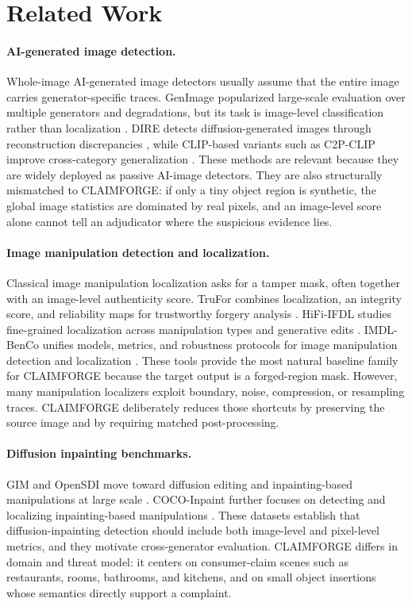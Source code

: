 \section{Related Work}

\paragraph{AI-generated image detection.}
Whole-image AI-generated image detectors usually assume that the entire image carries generator-specific traces. GenImage popularized large-scale evaluation over multiple generators and degradations, but its task is image-level classification rather than localization \citep{zhu2023genimage}. DIRE detects diffusion-generated images through reconstruction discrepancies \citep{wang2023dire}, while CLIP-based variants such as C2P-CLIP improve cross-category generalization \citep{tan2024c2pclip}. These methods are relevant because they are widely deployed as passive AI-image detectors. They are also structurally mismatched to CLAIMFORGE: if only a tiny object region is synthetic, the global image statistics are dominated by real pixels, and an image-level score alone cannot tell an adjudicator where the suspicious evidence lies.

\paragraph{Image manipulation detection and localization.}
Classical image manipulation localization asks for a tamper mask, often together with an image-level authenticity score. TruFor combines localization, an integrity score, and reliability maps for trustworthy forgery analysis \citep{guillaro2022trufor}. HiFi-IFDL studies fine-grained localization across manipulation types and generative edits \citep{guo2023hifi}. IMDL-BenCo unifies models, metrics, and robustness protocols for image manipulation detection and localization \citep{ma2024imdldbenco}. These tools provide the most natural baseline family for CLAIMFORGE because the target output is a forged-region mask. However, many manipulation localizers exploit boundary, noise, compression, or resampling traces. CLAIMFORGE deliberately reduces those shortcuts by preserving the source image and by requiring matched post-processing.

\paragraph{Diffusion inpainting benchmarks.}
GIM and OpenSDI move toward diffusion editing and inpainting-based manipulations at large scale \citep{chen2024gim,wang2025opensdi}. COCO-Inpaint further focuses on detecting and localizing inpainting-based manipulations \citep{yan2025cocoinpaint}. These datasets establish that diffusion-inpainting detection should include both image-level and pixel-level metrics, and they motivate cross-generator evaluation. CLAIMFORGE differs in domain and threat model: it centers on consumer-claim scenes such as restaurants, rooms, bathrooms, and kitchens, and on small object insertions whose semantics directly support a complaint.

